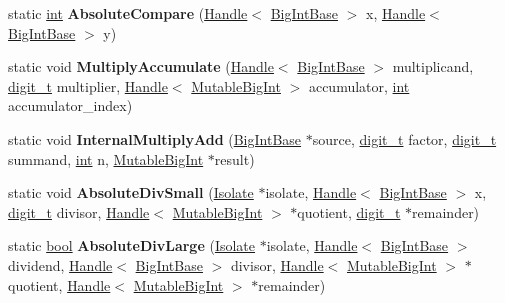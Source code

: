 \begin{DoxyCompactItemize}
static \mbox{\hyperlink{classint}{int}} {\bfseries Absolute\+Compare} (\mbox{\hyperlink{classv8_1_1internal_1_1Handle}{Handle}}$<$ \mbox{\hyperlink{classv8_1_1internal_1_1BigIntBase}{Big\+Int\+Base}} $>$ x, \mbox{\hyperlink{classv8_1_1internal_1_1Handle}{Handle}}$<$ \mbox{\hyperlink{classv8_1_1internal_1_1BigIntBase}{Big\+Int\+Base}} $>$ y)
\item 
\mbox{\label{classv8_1_1internal_1_1MutableBigInt_ae1dcf3b87608e4fd9b4414cc31a957c0}} 
static void {\bfseries Multiply\+Accumulate} (\mbox{\hyperlink{classv8_1_1internal_1_1Handle}{Handle}}$<$ \mbox{\hyperlink{classv8_1_1internal_1_1BigIntBase}{Big\+Int\+Base}} $>$ multiplicand, \mbox{\hyperlink{classuintptr__t}{digit\+\_\+t}} multiplier, \mbox{\hyperlink{classv8_1_1internal_1_1Handle}{Handle}}$<$ \mbox{\hyperlink{classv8_1_1internal_1_1MutableBigInt}{Mutable\+Big\+Int}} $>$ accumulator, \mbox{\hyperlink{classint}{int}} accumulator\+\_\+index)
\item 
\mbox{\label{classv8_1_1internal_1_1MutableBigInt_a6decb22f1edd708d0c146b99f4953213}} 
static void {\bfseries Internal\+Multiply\+Add} (\mbox{\hyperlink{classv8_1_1internal_1_1BigIntBase}{Big\+Int\+Base}} $\ast$source, \mbox{\hyperlink{classuintptr__t}{digit\+\_\+t}} factor, \mbox{\hyperlink{classuintptr__t}{digit\+\_\+t}} summand, \mbox{\hyperlink{classint}{int}} n, \mbox{\hyperlink{classv8_1_1internal_1_1MutableBigInt}{Mutable\+Big\+Int}} $\ast$result)
\item 
\mbox{\label{classv8_1_1internal_1_1MutableBigInt_ab46f0e6b0d5ef5ec78f882a416067333}} 
static void {\bfseries Absolute\+Div\+Small} (\mbox{\hyperlink{classv8_1_1internal_1_1Isolate}{Isolate}} $\ast$isolate, \mbox{\hyperlink{classv8_1_1internal_1_1Handle}{Handle}}$<$ \mbox{\hyperlink{classv8_1_1internal_1_1BigIntBase}{Big\+Int\+Base}} $>$ x, \mbox{\hyperlink{classuintptr__t}{digit\+\_\+t}} divisor, \mbox{\hyperlink{classv8_1_1internal_1_1Handle}{Handle}}$<$ \mbox{\hyperlink{classv8_1_1internal_1_1MutableBigInt}{Mutable\+Big\+Int}} $>$ $\ast$quotient, \mbox{\hyperlink{classuintptr__t}{digit\+\_\+t}} $\ast$remainder)
\item 
\mbox{\label{classv8_1_1internal_1_1MutableBigInt_afb34242a33ada9e4590230980f35a312}} 
static \mbox{\hyperlink{classbool}{bool}} {\bfseries Absolute\+Div\+Large} (\mbox{\hyperlink{classv8_1_1internal_1_1Isolate}{Isolate}} $\ast$isolate, \mbox{\hyperlink{classv8_1_1internal_1_1Handle}{Handle}}$<$ \mbox{\hyperlink{classv8_1_1internal_1_1BigIntBase}{Big\+Int\+Base}} $>$ dividend, \mbox{\hyperlink{classv8_1_1internal_1_1Handle}{Handle}}$<$ \mbox{\hyperlink{classv8_1_1internal_1_1BigIntBase}{Big\+Int\+Base}} $>$ divisor, \mbox{\hyperlink{classv8_1_1internal_1_1Handle}{Handle}}$<$ \mbox{\hyperlink{classv8_1_1internal_1_1MutableBigInt}{Mutable\+Big\+Int}} $>$ $\ast$quotient, \mbox{\hyperlink{classv8_1_1internal_1_1Handle}{Handle}}$<$ \mbox{\hyperlink{classv8_1_1internal_1_1MutableBigInt}{Mutable\+Big\+Int}} $>$ $\ast$remainder)

\end{DoxyCompactItemize}
